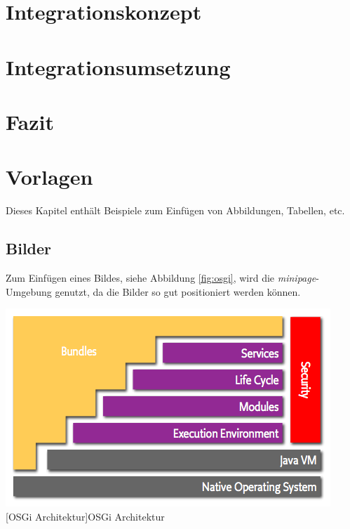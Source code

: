 \documentclass[12pt,a4paper,bibliography=totocnumbered,listof=totoc]{scrartcl}
\begin{document}
\pagebreak

\section{Integrationskonzept}

\pagebreak

\section{Integrationsumsetzung}

\pagebreak

\section{Fazit}

\pagebreak

\section{Vorlagen}
Dieses Kapitel enthält Beispiele zum Einfügen von Abbildungen, Tabellen, etc.

\subsection{Bilder}
Zum Einfügen eines Bildes, siehe Abbildung \ref{fig:osgi}, wird die \textit{minipage}-Umgebung genutzt, da die Bilder so gut positioniert werden können.

\vspace{1em}
\begin{minipage}{\linewidth}
	\centering
	\includegraphics[width=0.7\linewidth]{Bilder/layering-osgi.png}
	[OSGi Architektur]{OSGi Architektur\footnotemark }
	\label{fig:osgi}
\end{minipage}
\end{document}
